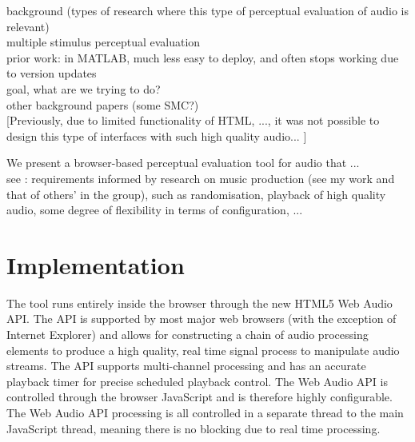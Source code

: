 \documentclass{article}
\begin{document}
background (types of research where this type of perceptual evaluation of audio is relevant)\\

multiple stimulus perceptual evaluation \cite{bech}\\

prior work: \cite{deman2014b} in MATLAB, much less easy to deploy, and often stops working due to version updates \\ 

goal, what are we trying to do? \\

other background papers (some SMC?)\\

[Previously, due to limited functionality of HTML, ..., it was not possible to design this type of interfaces with such high quality audio... ]



We present a browser-based perceptual evaluation tool for audio that ... \\

see \cite{deman2014b}: requirements informed by research on music production (see my work and that of others' in the group), such as randomisation, playback of high quality audio, some degree of flexibility in terms of configuration, ... \\


\section{Implementation}\label{sec:implementation}



The tool runs entirely inside the browser through the new HTML5 Web Audio API. The API is supported by most major web browsers (with the exception of Internet Explorer) and allows for constructing a chain of audio processing elements to produce a high quality, real time signal process to manipulate audio streams. The API supports multi-channel processing and has an accurate playback timer for precise scheduled playback control. The Web Audio API is controlled through the browser JavaScript and is therefore highly configurable. The Web Audio API processing is all controlled in a separate thread to the main JavaScript thread, meaning there is no blocking due to real time processing. 
\end{document}
